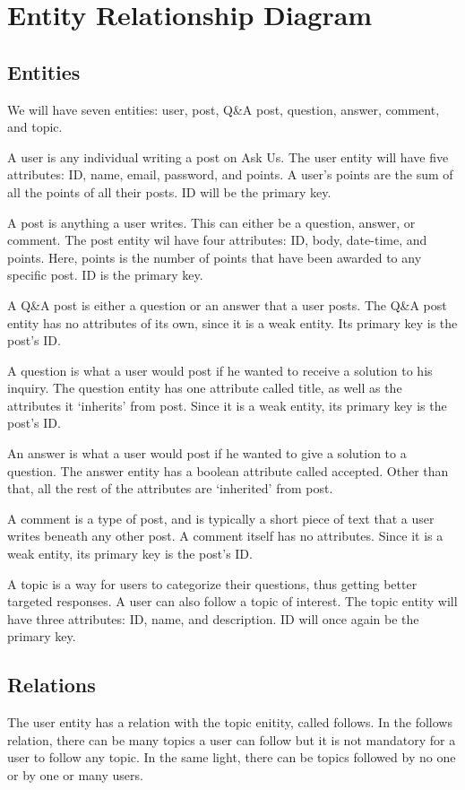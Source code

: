 \section{Entity Relationship Diagram}
\subsection{Entities}
We will have seven entities: user, post, Q\&A post, question, answer, comment, and topic.

A user is any individual writing a post on Ask Us. The user entity will have five attributes: ID, name, email, password, and points. A user's points are the sum of all the points of all their posts. ID will be the primary key.

A post is anything a user writes. This can either be a question, answer, or comment. The post entity wil have four attributes: ID, body, date-time, and points. Here, points is the number of points that have been awarded to any specific post. ID is the primary key.

A Q\&A post is either a question or an answer that a user posts. The Q\&A post entity has no attributes of its own, since it is a weak entity. Its primary key is the post's ID.

A question is what a user would post if he wanted to receive a solution to his inquiry. The question entity has one attribute called title, as well as the attributes it `inherits' from post. Since it is a weak entity, its primary key is the post's ID.

An answer is what a user would post if he wanted to give a solution to a question. The answer entity has a boolean attribute called accepted. Other than that, all the rest of the attributes are `inherited' from post.

A comment is a type of post, and is typically a short piece of text that a user writes beneath any other post. A comment itself has no attributes. Since it is a weak entity, its primary key is the post's ID.

A topic is a way for users to categorize their questions, thus getting better targeted responses. A user can also follow a topic of interest. The topic entity will have three attributes: ID, name, and description. ID will once again be the primary key.

\subsection{Relations}
The user entity has a relation with the topic enitity, called follows. In the follows relation, there can be many topics a user can follow but it is not mandatory for a user to follow any topic. In the same light, there can be topics followed by no one or by one or many users.

